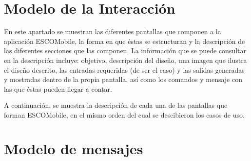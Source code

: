 \documentclass[oneside,10pt]{book}
\begin{document}


\chapter{Modelo de la Interacción}

\noindent
En este apartado se muestran las diferentes pantallas que componen a la aplicación ESCOMobile,
la forma en que éstas se estructuran y la descripción de las diferentes secciones que las componen.
La información que se puede consultar en la descripción incluye: objetivo, descripción del diseño, 
una imagen que ilustra el diseño descrito, las entradas requeridas (de ser el caso) y las salidas
generadas y mostradas dentro de la propia pantalla, así como los comandos y mensaje con las que
éstas pueden llegar a contar.

\noindent
\newline
A continuación, se muestra la descripción de cada una de las pantallas que forman ESCOMobile,
en el mismo orden del cual se descibieron los casos de uso.




\chapter{Modelo de mensajes}

\end{document}
